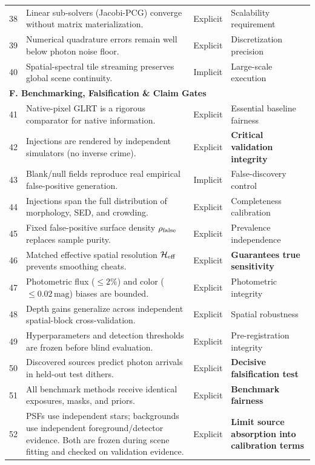 \documentclass[11pt,a4paper]{article}
\begin{document}
\begin{longtable}{r p{8.2cm} c p{4.0cm}}
38 & Linear sub-solvers (Jacobi-PCG) converge without matrix materialization. & Explicit & Scalability requirement \\
39 & Numerical quadrature errors remain well below photon noise floor. & Explicit & Discretization precision \\
40 & Spatial-spectral tile streaming preserves global scene continuity. & Implicit & Large-scale execution \\
\midrule
\multicolumn{4}{l}{\textbf{F. Benchmarking, Falsification \& Claim Gates}} \\
41 & Native-pixel GLRT is a rigorous comparator for native information. & Explicit & Essential baseline fairness \\
42 & Injections are rendered by independent simulators (no inverse crime). & Explicit & \textbf{Critical validation integrity} \\
43 & Blank/null fields reproduce real empirical false-positive generation. & Implicit & False-discovery control \\
44 & Injections span the full distribution of morphology, SED, and crowding. & Explicit & Completeness calibration \\
45 & Fixed false-positive surface density $\rho_{\rm false}$ replaces sample purity. & Explicit & Prevalence independence \\
46 & Matched effective spatial resolution $\mathcal{H}_{\rm eff}$ prevents smoothing cheats. & Explicit & \textbf{Guarantees true sensitivity} \\
47 & Photometric flux ($\le 2\%$) and color ($\le 0.02\,\mathrm{mag}$) biases are bounded. & Explicit & Photometric integrity \\
48 & Depth gains generalize across independent spatial-block cross-validation. & Explicit & Spatial robustness \\
49 & Hyperparameters and detection thresholds are frozen before blind evaluation. & Explicit & Pre-registration integrity \\
50 & Discovered sources predict photon arrivals in held-out test dithers. & Explicit & \textbf{Decisive falsification test} \\
51 & All benchmark methods receive identical exposures, masks, and priors. & Explicit & \textbf{Benchmark fairness} \\
52 & PSFs use independent stars; backgrounds use independent foreground/detector evidence. Both are frozen during scene fitting and checked on validation evidence. & Explicit & \textbf{Limit source absorption into calibration terms} \\
\end{longtable}
\endgroup
\end{document}
